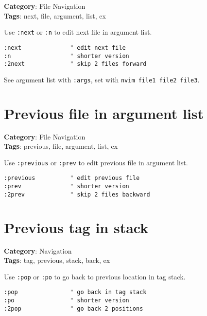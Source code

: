 {{{{{\textbf{Category}: File Navigation\\ \textbf{Tags}: next, file, argument, list, ex
\vspace{0.5cm}

Use {\footnotesize \Verb§:next§} or {\footnotesize \Verb§:n§} to edit next file in argument list.

\begin{Exa*}{}
\begin{Verbatim}[fontsize=\footnotesize, breaklines, breakanywhere]
:next              " edit next file
:n                 " shorter version
:2next             " skip 2 files forward
\end{Verbatim}
\end{Exa*}

See argument list with {\footnotesize \Verb§:args§}, set with {\footnotesize \Verb§nvim file1 file2 file3§}.

\section{Previous file in argument list}

\textbf{Category}: File Navigation\\ \textbf{Tags}: previous, file, argument, list, ex
\vspace{0.5cm}

Use {\footnotesize \Verb§:previous§} or {\footnotesize \Verb§:prev§} to edit previous file in argument list.

\begin{Exa*}{}
\begin{Verbatim}[fontsize=\footnotesize, breaklines, breakanywhere]
:previous          " edit previous file  
:prev              " shorter version
:2prev             " skip 2 files backward
\end{Verbatim}
\end{Exa*}

\section{Previous tag in stack}

\textbf{Category}: Navigation\\ \textbf{Tags}: tag, previous, stack, back, ex
\vspace{0.5cm}

Use {\footnotesize \Verb§:pop§} or {\footnotesize \Verb§:po§} to go back to previous location in tag stack.

\begin{Exa*}{}
\begin{Verbatim}[fontsize=\footnotesize, breaklines, breakanywhere]
:pop               " go back in tag stack
:po                " shorter version
:2pop              " go back 2 positions
\end{Verbatim}
\end{Exa*}

}}}}}
